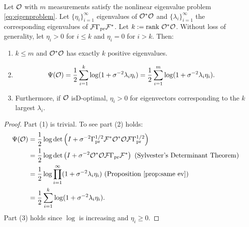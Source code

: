 \begin{proposition}\label{prop:true target}
  Let $\mathcal{O}$ with $m$ measurements satisfy the nonlinear eigenvalue
  problem \eqref{eq:eigenproblem}. Let $\{\eta_i\}_{i=1}^{\infty}$
  eigenvalues of $\mathcal{O}^*\mathcal{O}$ and $\{\lambda_i\}_{i=1}^{\infty}$ the
  corresponding eigenvalues of $\mathcal{F} \Gamma_{\textup{pr}} \mathcal{F}^*$. Let $k:=\textup{rank}\ 
  \mathcal{O}^*\mathcal{O}$. Without loss of generality, let $\eta_i > 0$ for $i\leq
  k$ and $\eta_i = 0$ for $i > k$. Then:
  \begin{enumerate}
    \item $k \leq m$ and $\mathcal{O}^*\mathcal{O}$ has exactly $k$ positive
      eigenvalues.
    \item
      \begin{equation*}
        \tar(\obs) = \frac12 \sum_{i=1}^{k} \log (1 + \sigma^{-2}\lambda_i\eta_i) = \frac12 \sum_{i=1}^{m} \log (1 + \sigma^{-2}\lambda_i\eta_i).
      \end{equation*}
    \item Furthermore, if $\mathcal{O}$ isD-optimal, $\eta_i > 0$ for
      eigenvectors corresponding to the $k$ largest $\lambda_i$.
  \end{enumerate}
\end{proposition}
\begin{proof}
  Part (1) is trivial. To see part (2) holds: 
  \begin{align}
    \begin{split}
      \tar(\obs) &= \frac12\log \det \left (I + \sigma^{-2} \prcov^{1/2} \fwd ^* \obs^*
      \obs \fwd \prcov^{1/2}\right )\\%
      &= \frac12 \log \det \left (I + \sigma^{-2} \obs^* \obs \fwd
      \prcov\fwd^* \right ) \text{ (Sylvester's Determinant
      Theorem)}\\
      &=\frac12 \log \prod_{i=1}^{\infty} ( 1 + \sigma^{-2} \lambda_i\eta_i ) \text{ (Proposition \ref{prop:same ev})} \\
      &=\frac12 \sum_{i=1}^{k} \log (1 + \sigma^{-2}\lambda_i\eta_i). 
    \end{split}
  \end{align}
  Part (3) holds since $\log$ is increasing and $\eta_i \geq 0$.
\end{proof}



